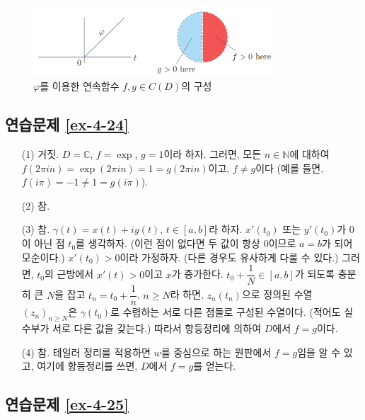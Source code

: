 \begin{figure}[h!]
\begin{center}
\includegraphics[width=0.8\textwidth]{./Solution/figs/fig-5-21}
\end{center}
\caption{$\varphi$를 이용한 연속함수 $f,g\in C(D)$의 구성
}
\label{fig-5-21}
\end{figure}

\subsection*{연습문제 \ref{ex-4-24}}

\begin{itemize}
\item[(1)]   거짓.
$D=\mathbb C$, $f=\exp$, $g=1$이라 하자.
그러면, 모든 $n\in \mathbb N$에 대하여
$f(2\pi i n) = \exp(2\pi i n) = 1 = g(2\pi i n)$이고,
$f\ne g$이다 (예를 들면, $f(i\pi) = -1 \ne 1 = g(i\pi)$).
\item[(2)] 참.
\item[(3)] 참. 
$\gamma(t) = x(t) +iy(t)$, $t\in[a,b]$라 하자.
$x'(t_0)$ 또는 $y'(t_0)$가 $0$이 아닌 점 $t_0$를 생각하자.
(이런 점이 없다면 두 값이 항상 $0$이므로 $a=b$가 되어 모순이다.)
$x'(t_0)>0$이라 가정하자. (다른 경우도 유사하게 다룰 수 있다.)
그러면, $t_0$의 근방에서 $x'(t)>0$이고 $x$가 증가한다.
$t_0+\dfrac1N\in [a,b]$가 되도록 충분히 큰 $N$을 잡고 $t_n = t_0 + \dfrac1n$, $n\ge N$라 하면,
$z_n(t_n)$으로 정의된 수열 $(z_n)_{n\ge N}$은 $\gamma(t_0)$로 수렴하는
서로 다른 점들로 구성된 수열이다. (적어도 실수부가 서로 다른 값을 갖는다.)
따라서 항등정리에 의하여 $D$에서 $f=g$이다.
\item[(4)] 참. 
테일러 정리를 적용하면 $w$를 중심으로 하는 원판에서 $ f=g$임을 알 수 있고,
여기에 항등정리를 쓰면, $D$에서 $f=g$를 얻는다.
\end{itemize}

\subsection*{연습문제 \ref{ex-4-25}}

